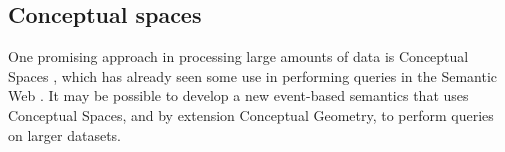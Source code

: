 \documentclass[../main.tex]{subfiles}
\begin{document}
\subsection{Conceptual spaces}

One promising approach in processing large amounts of data is Conceptual Spaces \cite{gardenfors2004conceptual}, which has already seen some use in performing queries in the Semantic Web \cite{wu2006exploring} \cite{adams2009conceptual} \cite{gardenfors2014geometry} .  It may be possible to develop a new event-based semantics that uses Conceptual Spaces, and by extension Conceptual Geometry, to perform queries on larger datasets.
\end{document}

